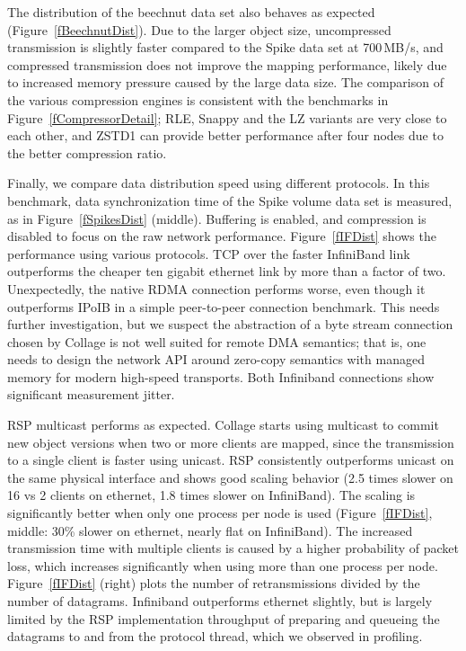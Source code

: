\documentclass[10pt,journal,compsoc]{IEEEtran}
\newcommand{\fig}[1]{Figure~\ref{#1}}
\begin{document}
The distribution of the beechnut data set also behaves as expected
(\fig{fBeechnutDist}). Due to the larger object size, uncompressed transmission
is slightly faster compared to the Spike data set at 700\,MB/s, and compressed
transmission does not improve the mapping performance, likely due to increased
memory pressure caused by the large data size. The comparison of the various
compression engines is consistent with the benchmarks in
\fig{fCompressorDetail}; RLE, Snappy and the LZ variants are very close to each
other, and ZSTD1 can provide better performance after four nodes due to the
better compression ratio.

Finally, we compare data distribution speed using different protocols. In this
benchmark, data synchronization time of the Spike volume data set is measured,
as in \fig{fSpikesDist} (middle). Buffering is enabled, and compression is
disabled to focus on the raw network performance. \fig{fIFDist} shows the
performance using various protocols. TCP over the faster InfiniBand link
outperforms the cheaper ten gigabit ethernet link by more than a factor of two.
Unexpectedly, the native RDMA connection performs worse, even though it
outperforms IPoIB in a simple peer-to-peer connection benchmark. This needs
further investigation, but we suspect the abstraction of a byte stream
connection chosen by \textsf{Collage} is not well suited for remote DMA
semantics; that is, one needs to design the network API around zero-copy
semantics with managed memory for modern high-speed transports. Both Infiniband
connections show significant measurement jitter.

RSP multicast performs as expected. \textsf{Collage} starts using multicast to
commit new object versions when two or more clients are mapped, since the
transmission to a single client is faster using unicast. RSP consistently
outperforms unicast on the same physical interface and shows good scaling
behavior (2.5 times slower on 16 vs 2 clients on ethernet, 1.8 times slower on
InfiniBand). The scaling is significantly better when only one process per node
is used (\fig{fIFDist}, middle: 30\% slower on ethernet, nearly flat on
InfiniBand). The increased transmission time with multiple clients is caused by
a higher probability of packet loss, which increases significantly when using
more than one process per node. \fig{fIFDist} (right) plots the number of
retransmissions divided by the number of datagrams. Infiniband outperforms
ethernet slightly, but is largely limited by the RSP implementation throughput
of preparing and queueing the datagrams to and from the protocol thread, which
we observed in profiling.
\end{document}

